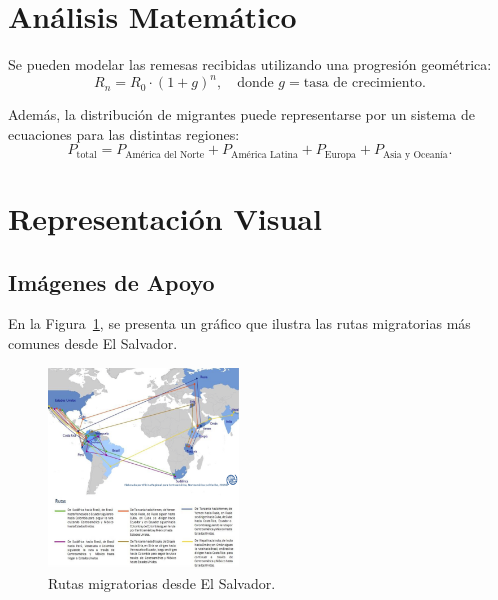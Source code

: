 \documentclass[conference]{IEEEtran}
\begin{document}
\section{Análisis Matemático}
Se pueden modelar las remesas recibidas utilizando una progresión geométrica:
\begin{equation}
R_n = R_0 \cdot (1 + g)^n, \quad \text{donde } g = \text{tasa de crecimiento}.
\label{eq:remesas}
\end{equation}

Además, la distribución de migrantes puede representarse por un sistema de ecuaciones para las distintas regiones:
\begin{equation}
P_{\text{total}} = P_{\text{América del Norte}} + P_{\text{América Latina}} + P_{\text{Europa}} + P_{\text{Asia y Oceanía}}.
\label{eq:distribucion}
\end{equation}

\section{Representación Visual}
\subsection{Imágenes de Apoyo}
En la Figura~\ref{fig:migrantes}, se presenta un gráfico que ilustra las rutas migratorias más comunes desde El Salvador.

\begin{figure}[H]
\centering
\includegraphics[width=0.45\textwidth]{imagenes/rutas_migratorias.png}
\caption{Rutas migratorias desde El Salvador.}
\label{fig:migrantes}
\end{figure}
\end{document}
